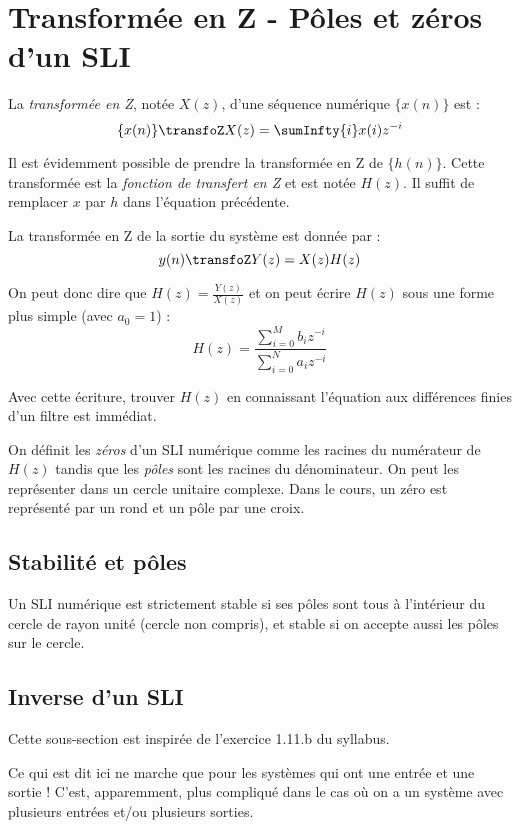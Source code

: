     \section{Transformée en Z - Pôles et zéros d'un SLI}
        La \textit{transformée en Z}, notée $X(z)$, d'une séquence numérique $\{x(n)\}$ est :
        $$
            \{x(n)\} \transfoZ X(z) = \sumInfty{i} x(i) z^{-i}
        $$

        Il est évidemment possible de prendre la transformée en Z de $\{h(n)\}$. Cette transformée est la \textit{fonction de transfert en Z} et est notée $H(z)$. Il suffit de remplacer $x$ par $h$ dans l'équation précédente.

        La transformée en Z de la sortie du système est donnée par :
        $$
            y(n) \transfoZ Y(z) = X(z)H(z)
        $$

        On peut donc dire que $H(z) = \frac{Y(z)}{X(z)}$ et on peut écrire $H(z)$ sous une forme plus simple (avec $a_0 = 1$) :
        $$
            H(z) = \frac{\sum\limits_{i=0}^M b_i z^{-i}}{\sum\limits_{i=0}^N a_i z^{-i}}
        $$

        Avec cette écriture, trouver $H(z)$ en connaissant l'équation aux différences finies d'un filtre est immédiat.

        On définit les \textit{zéros} d'un SLI numérique comme les racines du numérateur de $H(z)$ tandis que les \textit{pôles} sont les racines du dénominateur. On peut les représenter dans un cercle unitaire complexe. Dans le cours, un zéro est représenté par un rond et un pôle par une croix.

        \subsection{Stabilité et pôles}
            Un SLI numérique est strictement stable si ses pôles sont tous à l'intérieur du cercle de rayon unité (cercle non compris), et stable si on accepte aussi les pôles sur le cercle.
        
        \subsection{Inverse d'un SLI}
            \begin{remarque}
                Cette sous-section est inspirée de l'exercice 1.11.b du syllabus.

                Ce qui est dit ici ne marche que pour les systèmes qui ont une entrée et une sortie ! C'est, apparemment, plus compliqué dans le cas où on a un système avec plusieurs entrées et/ou plusieurs sorties.
            \end{remarque}

